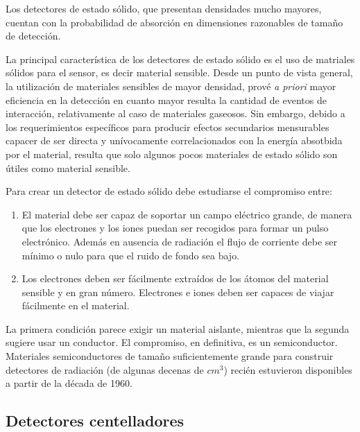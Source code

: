 %
Los detectores de estado s\'olido, que presentan 
densidades mucho mayores, cuentan con la probabilidad de absorci\'on en dimensiones razonables de tama\~no de detecci\'on.
%

%
La principal caracter\'istica de los detectores de estado s\'olido es el uso de matriales s\'olidos para el sensor, es decir material sensible. Desde un
punto de vista general, la utilizaci\'on de materiales sensibles de mayor densidad, prov\'e \textit{a priori} mayor eficiencia en la detecci\'on en cuanto
mayor resulta la cantidad de eventos de interacci\'on, relativamente al caso de materiales gaseosos. Sin embargo, debido a los requerimientos espec\'ificos
para producir efectos secundarios mensurables capacer de ser directa y un\'ivocamente correlacionados con la energ\'ia absotbida por el material, resulta 
que solo algunos pocos materiales de estado s\'olido son \'utiles como material sensible.
%

%
Para crear un detector de estado s\'olido debe estudiarse el compromiso entre:

\begin{enumerate}
 \item El material debe ser capaz de soportar un campo el\'ectrico grande, de manera que los electrones y los iones puedan ser recogidos 
 para formar un pulso electr\'onico. Adem\'as en ausencia de radiaci\'on el flujo de corriente debe ser m\'inimo o nulo para que el ruido 
 de fondo sea bajo. 
 \item Los electrones deben ser f\'acilmente extra\'idos de los \'atomos del material sensible y en gran n\'umero. Electrones e iones deben 
 ser capaces de viajar f\'acilmente en el material.
\end{enumerate}

La primera condici\'on parece exigir un material aislante, mientras que la segunda sugiere usar un conductor. El compromiso, en definitiva, 
es un semiconductor. Materiales semiconductores de tama\~no suficientemente grande para construir detectores de radiaci\'on (de algunas 
decenas de $cm^{3}$) reci\'en estuvieron disponibles a partir de la d\'ecada de 1960.

\subsection{Detectores centelladores}
\label{CapIII_10}

